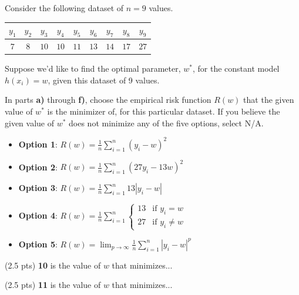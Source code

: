 \documentclass[11pt]{article}
\begin{document}
\begin{prob}
Consider the following dataset of $n = 9$ values.
\begin{center}
\begin{tabular}{|c|c|c|c|c|c|c|c|c|}
\hline
$y_1$ & $y_2$ & $y_3$ & $y_4$ & $y_5$ & $y_6$ & $y_7$ & $y_8$ & $y_9$ \\
\hline
$7$ & $8$ & $10$ & $10$ & $11$ & $13$ & $14$ & $17$ & $27$ \\
\hline
\end{tabular}
\end{center}

Suppose we'd like to find the optimal parameter, $w^*$, for the constant model $h(x_i) = w$, given this dataset of 9 values.

In parts \textbf{a)} through \textbf{f)}, choose the empirical risk function $R(w)$ that the given value of $w^*$ is the minimizer of, for this particular dataset. If you believe the given value of $w^*$ does not minimize any of the five options, select N/A.
\begin{itemize}
  \item \textbf{Option 1}: $\displaystyle R(w) = \frac{1}{n} \sum_{i = 1}^n (y_i - w)^2$
  \item \textbf{Option 2}: $\displaystyle R(w) = \frac{1}{n} \sum_{i = 1}^n (27y_i - 13w)^2$
  \item \textbf{Option 3}: $\displaystyle R(w) = \frac{1}{n} \sum_{i = 1}^n 13|y_i - w|$
  \item \textbf{Option 4}: $\displaystyle R(w) = \frac{1}{n} \sum_{i = 1}^n \begin{cases} 13 & \text{if } y_i = w \\ 27 & \text{if } y_i \neq w \end{cases}$
  \item \textbf{Option 5}: $\displaystyle R(w) = \lim_{p \rightarrow \infty} \frac{1}{n} \sum_{i = 1}^n |y_i - w|^p$
\end{itemize}

\begin{subprob}(2.5 pts) \textbf{10} is the value of $w$ that minimizes...

     

\end{subprob}

\begin{subprob}(2.5 pts) \textbf{11} is the value of $w$ that minimizes...


\end{subprob}
\end{prob}
\end{document}
